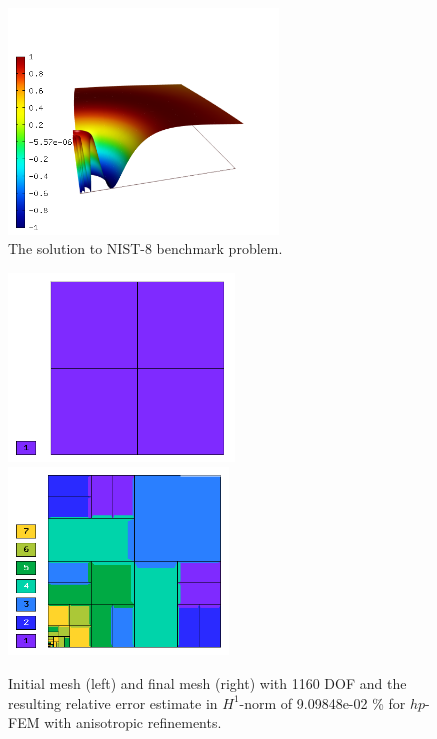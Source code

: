 \documentclass[12pt]{elsarticle}
\begin{document}
\begin{figure}[!ht]
\centering
\includegraphics[height=6cm]{nist/nist-8/solution.png}
\caption{The solution to NIST-8 benchmark problem.}
\label{fig:sln-nist08}
\end{figure}

\begin{figure}[!ht]
\centering
\includegraphics[height=5cm]{nist/nist-8/mesh_hp_aniso_init.png}\ \
\includegraphics[height=5cm]{nist/nist-8/mesh_hp_aniso.png}
\caption{Initial mesh (left) and final mesh (right) with 1160 DOF and the resulting relative error estimate in $H^1$-norm of 9.09848e-02 \% for $hp$-FEM with anisotropic refinements.}
\label{fig:nist-8-hp-aniso}
\end{figure}
\end{document}
